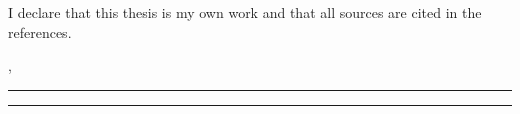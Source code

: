 I declare that this thesis is my own work and that all sources are cited in the references.\par
\vspace{2cm}
\noindent\ThesisPlace, \rule{3cm}{0.4pt}\hfill\rule{6cm}{0.4pt}\par
\hfill\makebox[6cm]{\ThesisAuthor}\par
